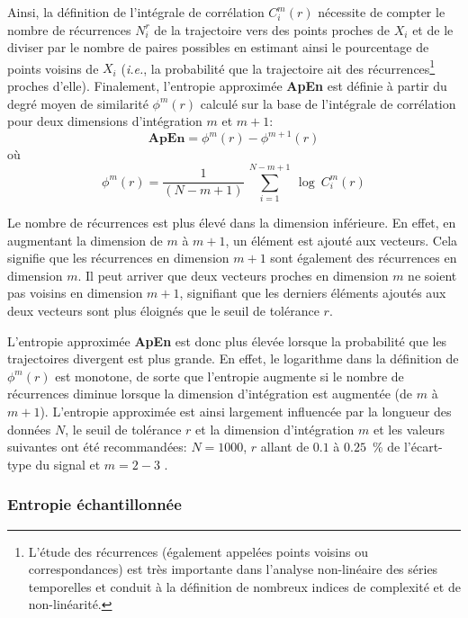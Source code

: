 Ainsi, la définition de l'intégrale de corrélation $C_i^m(r)$ nécessite de compter le nombre de récurrences $N_i^r$ de la trajectoire vers des points proches de $X_i$ et de le diviser par le nombre de paires possibles en estimant ainsi le pourcentage de points voisins de $X_i$ (\textit{i.e.}, la probabilité que la trajectoire ait des récurrences\footnote{L'étude des récurrences (également appelées points voisins ou correspondances) est très importante dans l'analyse non-linéaire des séries temporelles et conduit à la définition de nombreux indices de complexité et de non-linéarité.} proches d'elle). 
Finalement, l'entropie approximée \textbf{ApEn} est définie à partir du degré moyen de similarité $\phi^m(r)$ calculé sur la base de l'intégrale de corrélation pour deux dimensions d'intégration $m$ et $m+1$: \\

\begin{equation}
\textbf{ApEn} = \phi^m(r) - \phi^{m+1}(r)
\end{equation}
où 
\begin{equation}
\phi^m(r) = \frac{1}{(N-m+1)} ~ \sum_{i=1}^{N-m+1}~\log~C_i^m(r)
\end{equation}

Le nombre de récurrences est plus élevé dans la dimension inférieure. 
En effet, en augmentant la dimension de $m$ à $m+1$, un élément est ajouté aux vecteurs. 
Cela signifie que les récurrences en dimension $m+1$ sont également des récurrences en dimension $m$. 
Il peut arriver que deux vecteurs proches en dimension $m$ ne soient pas voisins en dimension $m+1$, signifiant que les derniers éléments ajoutés aux deux vecteurs sont plus éloignés que le seuil de tolérance $r$. 

L'entropie approximée \textbf{ApEn} est donc plus élevée lorsque la probabilité que les trajectoires divergent est plus grande. 
En effet, le logarithme dans la définition de $\phi^m(r)$ est monotone, de sorte que l'entropie augmente si le nombre de récurrences diminue lorsque la dimension d'intégration est augmentée (de $m$ à $m+1$).
L'entropie approximée est ainsi largement influencée par la longueur des données $N$, le seuil de tolérance $r$ et la dimension d'intégration $m$ et les valeurs suivantes ont été recommandées: $N=1000$, $r$ allant de $0.1$ à $0.25$~\% de l'écart-type du signal et $m=2-3$ \citep{bruhn2000approximate, pincus1991approximate}.

\subsubsection*{Entropie échantillonnée}

